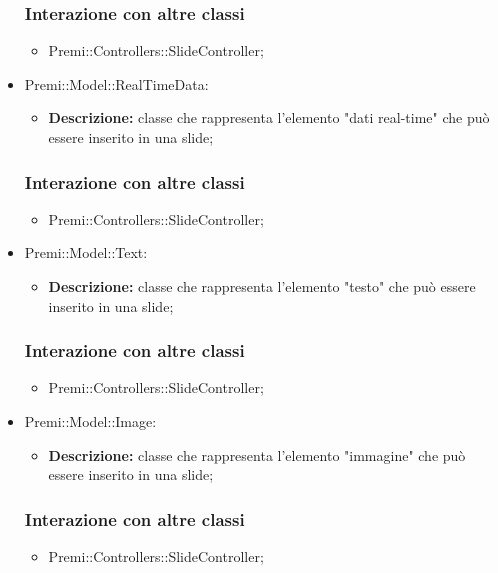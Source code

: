 \begin{itemize}
		\subsubsection*{Interazione con altre classi}
		\begin{itemize}
			\item Premi::Controllers::SlideController;
		\end{itemize}
		
		\item Premi::Model::RealTimeData:
		\begin{itemize}
			\item \textbf{Descrizione:} classe che rappresenta l'elemento "dati real-time" che può essere inserito in una \gls{slide};
		\end{itemize}
		\subsubsection*{Interazione con altre classi}
		\begin{itemize}
			\item Premi::Controllers::SlideController;
		\end{itemize}
		
		\item Premi::Model::Text:
		\begin{itemize}
			\item \textbf{Descrizione:} classe che rappresenta l'elemento "testo" che può essere inserito in una \gls{slide};
		\end{itemize}
		\subsubsection*{Interazione con altre classi}
		\begin{itemize}
			\item Premi::Controllers::SlideController;
		\end{itemize}
		
		\item Premi::Model::Image:
		\begin{itemize}
			\item \textbf{Descrizione:} classe che rappresenta l'elemento "immagine" che può essere inserito in una \gls{slide};
		\end{itemize}
		\subsubsection*{Interazione con altre classi}
		\begin{itemize}
			\item Premi::Controllers::SlideController;
		\end{itemize}
		

\end{itemize}
